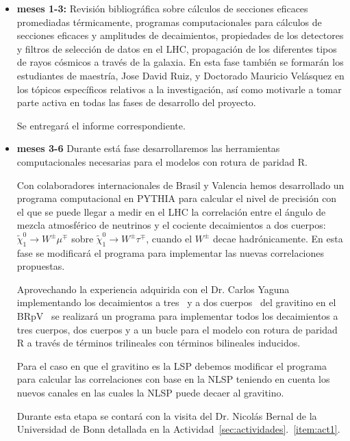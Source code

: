 \begin{itemize}
\item \textbf{meses 1-3:} Revisión bibliográfica sobre cálculos de
  secciones eficaces promediadas térmicamente, programas
  computacionales para cálculos de secciones eficaces y amplitudes de
  decaimientos, propiedades de los detectores y filtros de selección
  de datos en el LHC, propagación de los diferentes tipos de rayos
  cósmicos a través de la galaxia.  En esta fase también se formarán los
  estudiantes  de maestría, Jose David Ruiz, y Doctorado Mauricio
  Velásquez en los tópicos específicos relativos a la
  investigación, así como motivarle a tomar parte activa en todas las
  fases de desarrollo del proyecto.

  Se entregará el informe correspondiente.
\item \textbf{meses 3-6} Durante está fase desarrollaremos las
  herramientas computacionales necesarias para el modelos con rotura
  de paridad R.

\begin{brpvlhc}
  Con colaboradores internacionales de Brasil y Valencia hemos desarrollado un
  programa computacional en PYTHIA para calcular el nivel de precisión
  con el que se puede llegar a medir en el LHC la correlación entre el
  ángulo de mezcla atmosférico de neutrinos y el cociente decaimientos
  a dos cuerpos: $\tilde\chi_1^0\to W^\pm\mu^\mp$ sobre
  $\tilde\chi_1^0\to W^\pm\tau^\mp$, cuando el $W^\pm$ decae
  hadrónicamente.  En esta fase se modificará el programa para
  implementar las nuevas correlaciones propuestas.
\end{brpvlhc}

\begin{gravitinodm}
  Aprovechando la experiencia adquirida con el Dr. Carlos Yaguna
  implementando los decaimientos a tres~\cite{Choi:2010xn,Choi:2010jt}
  y a dos cuerpos~\cite{Restrepo:2011rj} del gravitino en el
  BRpV~\cite{Choi:2010xn,Choi:2010jt} se realizará un programa para
  implementar todos los decaimientos a tres cuerpos, dos cuerpos y a
  un bucle para el modelo con rotura de paridad R a través de
  términos trilineales con términos bilineales inducidos.

  Para el caso en que el gravitino es la LSP debemos modificar el
  programa para calcular las correlaciones con base en la NLSP
  teniendo en cuenta los nuevos canales en las cuales la NLSP puede
  decaer al gravitino.

  Durante esta etapa se contará con la visita del Dr. Nicolás Bernal
  de la Universidad de Bonn detallada en la
  Actividad~\ref{sec:actividades}.~\ref{item:act1}. 


\end{gravitinodm}
\end{itemize}

